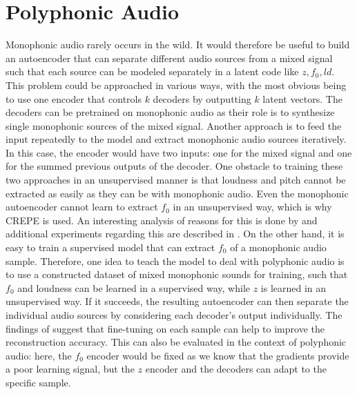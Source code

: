 \section{Polyphonic Audio}
\label{polyphonic}
Monophonic audio rarely occurs in the wild. It would therefore be useful to build an autoencoder that can separate different audio sources from a mixed signal such that each source can be modeled separately in a latent code like $z, f_0, ld$. This problem could be approached in various ways, with the most obvious being to use one encoder that controls $k$ decoders by outputting $k$ latent vectors. The decoders can be pretrained on monophonic audio as their role is to synthesize single monophonic sources of the mixed signal. \newline
Another approach is to feed the input repeatedly to the model and extract monophonic audio sources iteratively. In this case, the encoder would have two inputs: one for the mixed signal and one for the summed previous outputs of the decoder. \newline
One obstacle to training these two approaches in an unsupervised manner is that loudness and pitch cannot be extracted as easily as they can be with monophonic audio. Even the monophonic autoencoder cannot learn to extract $f_0$ in an unsupervised way, which is why CREPE is used. An interesting analysis of reasons for this is done by \citet{turian_im_nodate} and additional experiments regarding this are described in . \newline
On the other hand, it is easy to train a supervised model that can extract $f_0$ of a monophonic audio sample.
Therefore, one idea to teach the model to deal with polyphonic audio is to use a constructed dataset of mixed monophonic sounds for training, such that $f_0$ and loudness can be learned in a supervised way, while $z$ is learned in an unsupervised way. \newline
If it succeeds, the resulting autoencoder can then separate the individual audio sources by considering each decoder's output individually. The findings of  suggest that fine-tuning on each sample can help to improve the reconstruction accuracy. This can also be evaluated in the context of polyphonic audio: here, the $f_0$ encoder would be fixed as we know that the gradients provide a poor learning signal, but the $z$ encoder and the decoders can adapt to the specific sample. \newline

